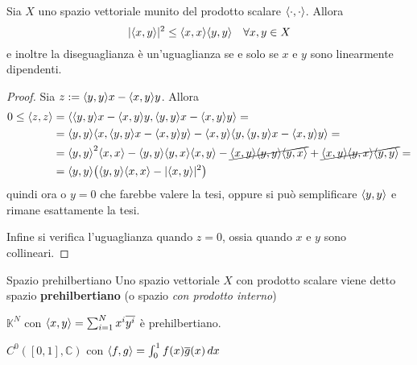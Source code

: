 \begin{lemmao}
    Sia \(X\) uno spazio vettoriale munito del prodotto scalare \({\left\langle\cdot ,\cdot \right\rangle} \). Allora
    \[
      |{\left\langle x,y\right\rangle} |^2 \le {\left\langle x,x\right\rangle} {\left\langle y,y\right\rangle} \quad \forall x,y \in X
    \]
    e inoltre la diseguaglianza è un'uguaglianza se e solo se \(x\) e \(y\) sono
    linearmente dipendenti.
\end{lemmao}
\begin{proof}{}
    Sia \(z := {\left\langle y,y\right\rangle} x - {\left\langle x,y\right\rangle} y\). Allora 
    \begin{align*}
        0 \le {\left\langle z,z\right\rangle} &= {\left\langle{\left\langle y,y\right\rangle} x - {\left\langle x,y\right\rangle} y, {\left\langle y,y\right\rangle} x - {\left\langle x,y\right\rangle} y\right\rangle} = \\
                &= {\left\langle y,y\right\rangle} {\left\langle x, {\left\langle y,y\right\rangle} x - {\left\langle x,y\right\rangle} y\right\rangle} - {\left\langle x,y\right\rangle} {\left\langle y, {\left\langle y,y\right\rangle} x - {\left\langle x,y\right\rangle} y\right\rangle} = \\
                &= {\left\langle y,y\right\rangle}^2{\left\langle x,x\right\rangle} - {\left\langle y,y\right\rangle} {\left\langle y,x\right\rangle} {\left\langle x,y\right\rangle} -
                \cancel{{\left\langle x,y\right\rangle} {\left\langle y,y\right\rangle} {\left\langle y,x\right\rangle}} + \cancel{{\left\langle x,y\right\rangle} {\left\langle y,x\right\rangle} {\left\langle y,y\right\rangle}} = \\
                &= {\left\langle y,y\right\rangle} {\left({\left\langle y,y\right\rangle} {\left\langle x,x\right\rangle} -
                    |{\left\langle x,y\right\rangle}|^2\right)}
    \end{align*}
    quindi ora o \(y=0\) che farebbe valere la tesi, oppure si può semplificare
    \({\left\langle y,y\right\rangle} \) e rimane esattamente la tesi.

    Infine si verifica l'uguaglianza quando \(z=0\), ossia quando \(x\) e \(y\)
    sono collineari.
\end{proof}

\begin{definition}{Spazio prehilbertiano}
    Uno spazio vettoriale \(X\) con prodotto scalare viene detto spazio \textbf{prehilbertiano} (o spazio \emph{con prodotto interno})
\end{definition}
\begin{example}{}
    \(\mathbb{K}^{N}\) con \({\left\langle x,y\right\rangle} = \sum_{i=1}^{N} x^{i}\overline{y^{i}} \) è prehilbertiano.
\end{example}
\begin{example}{}
    \(C^{0}{([0,1], \mathbb{C})}\) con \({\left\langle f,g\right\rangle} = \int_{0}^{1} f{(x)}\overline{g}{(x)} \,d x \) 
\end{example}


